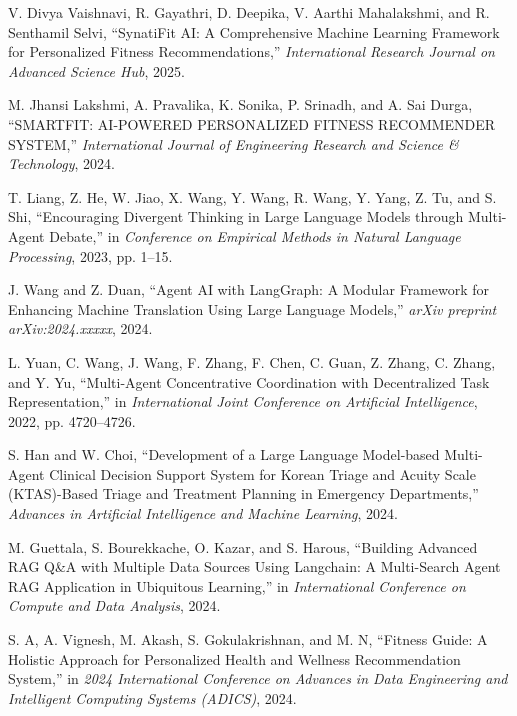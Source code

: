 \documentclass[conference]{IEEEtran}
\begin{document}
\begin{thebibliography}{20}

V. Divya Vaishnavi, R. Gayathri, D. Deepika, V. Aarthi Mahalakshmi, and R. Senthamil Selvi, ``SynatiFit AI: A Comprehensive Machine Learning Framework for Personalized Fitness Recommendations,'' \textit{International Research Journal on Advanced Science Hub}, 2025.

M. Jhansi Lakshmi, A. Pravalika, K. Sonika, P. Srinadh, and A. Sai Durga, ``SMARTFIT: AI-POWERED PERSONALIZED FITNESS RECOMMENDER SYSTEM,'' \textit{International Journal of Engineering Research and Science \& Technology}, 2024.

T. Liang, Z. He, W. Jiao, X. Wang, Y. Wang, R. Wang, Y. Yang, Z. Tu, and S. Shi, ``Encouraging Divergent Thinking in Large Language Models through Multi-Agent Debate,'' in \textit{Conference on Empirical Methods in Natural Language Processing}, 2023, pp. 1--15.

J. Wang and Z. Duan, ``Agent AI with LangGraph: A Modular Framework for Enhancing Machine Translation Using Large Language Models,'' \textit{arXiv preprint arXiv:2024.xxxxx}, 2024.

L. Yuan, C. Wang, J. Wang, F. Zhang, F. Chen, C. Guan, Z. Zhang, C. Zhang, and Y. Yu, ``Multi-Agent Concentrative Coordination with Decentralized Task Representation,'' in \textit{International Joint Conference on Artificial Intelligence}, 2022, pp. 4720--4726.

S. Han and W. Choi, ``Development of a Large Language Model-based Multi-Agent Clinical Decision Support System for Korean Triage and Acuity Scale (KTAS)-Based Triage and Treatment Planning in Emergency Departments,'' \textit{Advances in Artificial Intelligence and Machine Learning}, 2024.

M. Guettala, S. Bourekkache, O. Kazar, and S. Harous, ``Building Advanced RAG Q\&A with Multiple Data Sources Using Langchain: A Multi-Search Agent RAG Application in Ubiquitous Learning,'' in \textit{International Conference on Compute and Data Analysis}, 2024.

S. A, A. Vignesh, M. Akash, S. Gokulakrishnan, and M. N, ``Fitness Guide: A Holistic Approach for Personalized Health and Wellness Recommendation System,'' in \textit{2024 International Conference on Advances in Data Engineering and Intelligent Computing Systems (ADICS)}, 2024.


\end{thebibliography}
\end{document}
